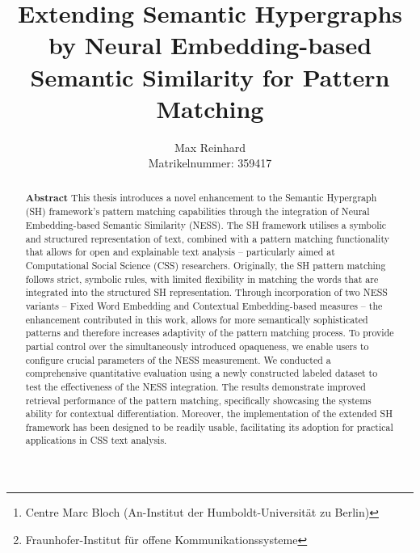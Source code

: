 \documentclass[11pt, numbers=noenddot]{scrreprt}
\begin{document}
\subject{Masters Thesis in Computer Science}
\title{Extending Semantic Hypergraphs by Neural Embedding-based Semantic Similarity for Pattern Matching}
\author{Max Reinhard \\ \small Matrikelnummer: 359417}

\date{\DTMtoday} %

\newcommand{\cmb}{\thanks{Centre Marc Bloch (An-Institut der Humboldt-Universität zu Berlin)}}
\newcommand{\fhfokus}{\thanks{Fraunhofer-Institut für offene Kommunikationssysteme}}

\publishers{Supervised by Prof. Dr. Manfred Hauswirth \\
	Additional guidance by Prof. Dr. Camille Roth\cmb, \\
	Dr. Telmo Menezes\footnotemark[1] \ and Dipl.-Math. Thilo Ernst\fhfokus
}
	
\maketitle

\begin{abstract}
\textbf{Abstract}
This thesis introduces a novel enhancement to the Semantic Hypergraph (SH) framework's pattern matching capabilities through the integration of Neural Embedding-based Semantic Similarity (NESS). The SH framework utilises a symbolic and structured representation of text, combined with a pattern matching functionality that allows for open and explainable text analysis -- particularly aimed at Computational Social Science (CSS) researchers. Originally, the SH pattern matching follows strict, symbolic rules, with limited flexibility in matching the words that are integrated into the structured SH representation. Through incorporation of two NESS variants -- Fixed Word Embedding and Contextual Embedding-based measures -- the enhancement contributed in this work, allows for more semantically sophisticated patterns and therefore increases adaptivity of the pattern matching process. To provide partial control over the simultaneously introduced opaqueness, we enable users to configure crucial parameters of the NESS measurement. We conducted a comprehensive quantitative evaluation using a newly constructed labeled dataset to test the effectiveness of the NESS integration. The results demonstrate improved retrieval performance of the pattern matching, specifically showcasing the systems ability for contextual differentiation. Moreover, the implementation of the extended SH framework has been designed to be readily usable, facilitating its adoption for practical applications in CSS text analysis.
\end{abstract}
\end{document}
